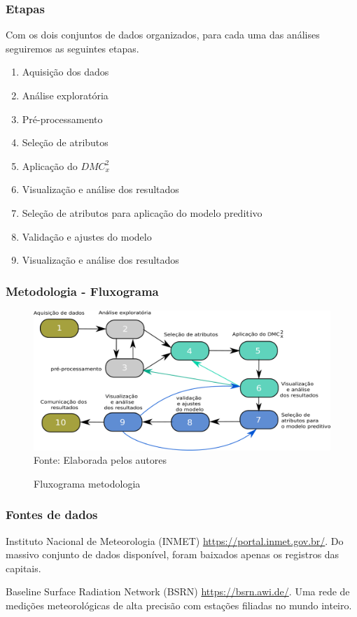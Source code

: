 \documentclass[11pt, aspectratio=169]{beamer}
\newcommand{\dmc}{\(DMC_x^2\) }
\begin{document}
\begin{frame}

  \frametitle{Etapas}
  Com os dois conjuntos de dados organizados, para cada uma das análises seguiremos as seguintes etapas.

  \begin{enumerate}
    \item Aquisição dos dados
    \item Análise exploratória
    \item Pré-processamento
    \item Seleção de atributos
    \item Aplicação do \dmc
    \item Visualização e análise dos resultados
    \item Seleção de atributos para aplicação do modelo preditivo
    \item Validação e ajustes do modelo
    \item Visualização e análise dos resultados
  \end{enumerate}
\end{frame}


\begin{frame}
  \frametitle{Metodologia - Fluxograma}

  \begin{figure}[!htb]
    \centering
    \caption{Fluxograma metodologia}
    \includegraphics[height=.6\paperheight]{../Figures/intro/metodo.png}
    \\{\footnotesize Fonte: Elaborada pelos autores}
    \label{fig:metodo}
  \end{figure}


\end{frame}


\begin{frame}
  \frametitle{Fontes de dados}

  Instituto Nacional de Meteorologia (INMET) \url{https://portal.inmet.gov.br/}. Do massivo conjunto de dados disponível, foram baixados apenas os registros das capitais.

  Baseline Surface Radiation Network (BSRN) \url{https://bsrn.awi.de/}. Uma rede de medições meteorológicas de alta precisão com estações filiadas no mundo inteiro.

\end{frame}
\end{document}
